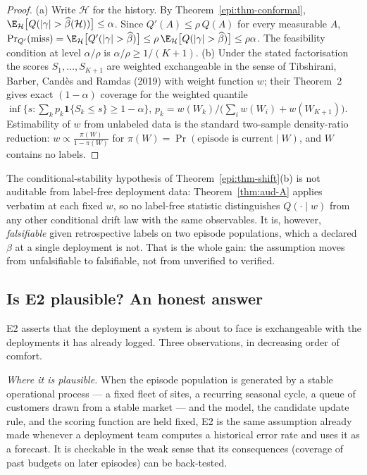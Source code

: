 \begin{proof}
(a) Write $\mathcal H$ for the history. By Theorem~\ref{epi:thm-conformal},
$\E_{\mathcal H}\bigl[Q(|\gamma|>\widehat\beta(\mathcal H))\bigr]\le\alpha$. Since
$Q'(A)\le\rho\,Q(A)$ for every measurable $A$,
$\Pr_{Q'}(\text{miss})=\E_{\mathcal H}\bigl[Q'(|\gamma|>\widehat\beta)\bigr]
\le\rho\,\E_{\mathcal H}\bigl[Q(|\gamma|>\widehat\beta)\bigr]\le\rho\alpha$. The feasibility
condition at level $\alpha/\rho$ is $\alpha/\rho\ge1/(K+1)$.
(b) Under the stated factorisation the scores $S_1,\dots,S_{K+1}$ are weighted exchangeable in the
sense of Tibshirani, Barber, Cand\`es and Ramdas (2019) with weight function
$w$; their Theorem~2 gives exact $(1-\alpha)$ coverage for the weighted quantile
$\inf\{s:\sum_k p_k\mathbf 1\{S_k\le s\}\ge1-\alpha\}$,
$p_k=w(W_k)/\bigl(\sum_i w(W_i)+w(W_{K+1})\bigr)$. Estimability of $w$ from unlabeled data is the
standard two-sample density-ratio reduction: $w\propto\frac{\pi(W)}{1-\pi(W)}$ for
$\pi(W)=\Pr(\text{episode is current}\mid W)$, and $W$ contains no labels.
\end{proof}

\begin{corollary}\label{epi:cor-not-free}
The conditional-stability hypothesis of Theorem~\ref{epi:thm-shift}(b) is not auditable from
label-free deployment data: Theorem~\ref{thm:aud-A} applies verbatim at each fixed $w$, so no
label-free statistic distinguishes $Q(\cdot\mid w)$ from any other conditional drift law with the
same observables. It is, however, \emph{falsifiable} given retrospective labels on two episode
populations, which a declared $\beta$ at a single deployment is not. That is the whole gain:
the assumption moves from unfalsifiable to falsifiable, not from unverified to verified.
\end{corollary}

\subsection{Is E2 plausible? An honest answer}
\label{epi:sec-honesty}

E2 asserts that the deployment a system is about to face is exchangeable with the deployments it has
already logged. Three observations, in decreasing order of comfort.

\emph{Where it is plausible.} When the episode population is generated by a stable operational
process --- a fixed fleet of sites, a recurring seasonal cycle, a queue of customers drawn from a
stable market --- and the model, the candidate update rule, and the scoring function are held fixed,
E2 is the same assumption already made whenever a deployment team computes a historical error rate
and uses it as a forecast. It is checkable in the weak sense that its consequences (coverage of past
budgets on later episodes) can be back-tested.

